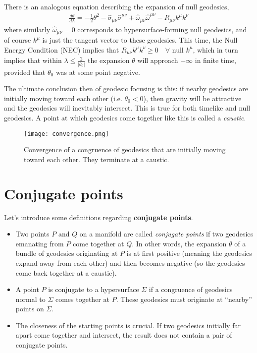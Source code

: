 \documentclass[10pt]{article}
\begin{document}
               		\par There is an analogous equation describing the expansion of null geodesics,
               		\begin{align}
               		    \frac{d\theta}{d\lambda} = -\frac{1}{2}\theta^2 - \hat{\sigma}_{\mu\nu}\hat{\sigma}^{\mu\nu} + \hat{\omega}_{\mu\nu}\hat{\omega}^{\mu\nu} - R_{\mu\nu} k^\mu k^\nu
               		\end{align}
               		where similarly $\hat{\omega}_{\mu\nu} = 0$ corresponds to hypersurface-forming null geodesics, and of course $k^\mu$ is just the tangent vector to these geodesics. This time, the Null Energy Condition (NEC) implies that $R_{\mu\nu} k^\mu k^\nu \geq 0\quad \forall$ null $k^\mu$, which in turn implies that within $\lambda \leq \frac{2}{|\theta_0|}$ the expansion $\theta$ will approach $-\infty$ in finite time, provided that $\theta_0$ was at some point negative.
               		
               		\par The ultimate conclusion then of geodesic focusing is this: if nearby geodesics are initially moving toward each other (i.e. $\theta_0 < 0$), then gravity will be attractive and the geodesics will inevitably intersect. This is true for both timelike and null geodesics. A point at which geodesics come together like this is called a \textit{caustic}.
               		
               	\begin{figure}[!h]
               	    \centering
               	    \texttt{[image: convergence.png]}
               	    \caption{Convergence of a congruence of geodesics that are initially moving toward each other. They terminate at a caustic.}
               	    \label{fig:my_label}
               	\end{figure}
               		
               	\section{Conjugate points}\label{sec:best_prac}
               	Let's introduce some definitions regarding \textbf{conjugate points}.
               		\begin{itemize}
               		    \item Two points $P$ and $Q$ on a manifold are called \textit{conjugate points} if two geodesics emanating from $P$ come together at $Q$. In other words, the expansion $\theta$ of a bundle of geodesics originating at $P$ is at first positive (meaning the geodesics expand away from each other) and then becomes negative (so the geodesics come back together at a caustic).
               		    \item A point $P$ is conjugate to a hypersurface $\Sigma$ if a congruence of geodesics normal to $\Sigma$ comes together at $P$. These geodesics must originate at ``nearby'' points on $\Sigma$.
               		    \item The closeness of the starting points is crucial. If two geodesics initially far apart come together and intersect, the result does not contain a pair of conjugate points.
               		\end{itemize}
               		
\end{document}

